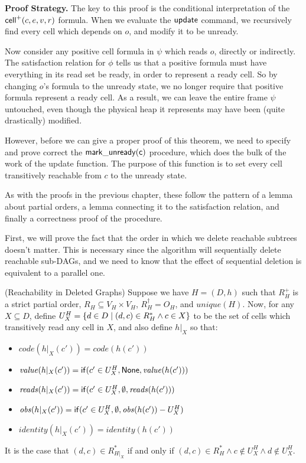 \textbf{Proof Strategy.} The key to this proof is the conditional
interpretation of the $\mathsf{cell}^{+}({c}, {e}, {v}, {r})$ formula. When we evaluate
the $\mathsf{update}$ command, we recursively find every cell which
depends on $o$, and modify it to be unready.

Now consider any positive cell formula in $\psi$ which reads $o$,
directly or indirectly. The satisfaction relation for $\phi$ tells us
that a positive formula must have everything in its read set be ready,
in order to represent a ready cell. So by changing $o$'s formula to
the unready state, we no longer require that positive formula
represent a ready cell. As a result, we can leave the entire frame
$\psi$ untouched, even though the physical heap it represents may have
been (quite drastically) modified.

However, before we can give a proper proof of this theorem, we need to
specify and prove correct the $\mathsf{mark\_unready(c)}$ procedure,
which does the bulk of the work of the update function. The purpose of
this function is to set every cell transitively reachable from $c$ to
the unready state.

As with the proofs in the previous chapter, these follow the pattern 
of a lemma about partial orders, a lemma connecting it to the satisfaction
relation, and finally a correctness proof of the procedure. 

First, we will prove the fact that the order in which we delete
reachable subtrees doesn't matter. This is necessary since the 
algorithm will sequentially delete reachable sub-DAGs, and we
need to know that the effect of sequential deletion is equivalent
to a parallel one.  

\begin{lemma}{(Reachability in Deleted Graphs)}
Suppose we have $H = (D,h)$ such that $R^+_H$ is a strict partial
order, $R_H \subseteq V_H \times V_H$, $R^\dagger_H = O_H$, and
$\mathit{unique}(H)$.  Now, for any $X \subseteq D$, define $U^H_X =
\{{{d \in D}\;|\;{(d, c) \in R^*_H \land c \in X}}\}$ to be the set
of cells which transitively read any cell in $X$, and also define
$h|_X$ so that:
\begin{itemize}
\item $\mathit{code}(h|_X(c')) = \mathit{code}(h(c'))$
\item $\mathit{value}(h|_X(c')) = \mathsf{if}({c' \in U^H_X}, {\mathsf{None}}, {\mathit{value}(h(c'))})$
\item $\mathit{reads}(h|_X(c')) = \mathsf{if}({c' \in U^H_X}, {\emptyset}, {\mathit{reads}(h(c'))})$
\item $\mathit{obs}(h|_X(c')) = \mathsf{if}({c' \in U^H_X}, {\emptyset}, {\mathit{obs}(h(c')) - U^H_X})$
\item $\mathit{identity}(h|_X(c')) = \mathit{identity}(h(c'))$
\end{itemize}

It is the case that $(d,c) \in R^*_{H|_X}$ if and only if $(d,c) \in R^*_H \land c \not\in U^H_X \land d \not\in U^H_X$. 
\end{lemma}

